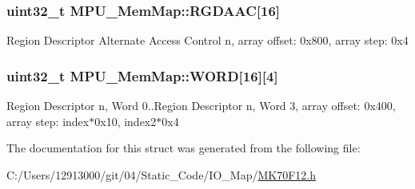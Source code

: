 \subsubsection[{R\+G\+D\+A\+A\+C}]{\setlength{\rightskip}{0pt plus 5cm}uint32\+\_\+t M\+P\+U\+\_\+\+Mem\+Map\+::\+R\+G\+D\+A\+A\+C\mbox{[}16\mbox{]}}\label{struct_m_p_u___mem_map_a7f9c813f610ff2ffa2027cec351b0b1f}
Region Descriptor Alternate Access Control n, array offset\+: 0x800, array step\+: 0x4 \hypertarget{struct_m_p_u___mem_map_ac0f1b1c2b2f2b70a90e02302add086f1}{}
\subsubsection[{W\+O\+R\+D}]{\setlength{\rightskip}{0pt plus 5cm}uint32\+\_\+t M\+P\+U\+\_\+\+Mem\+Map\+::\+W\+O\+R\+D\mbox{[}16\mbox{]}\mbox{[}4\mbox{]}}\label{struct_m_p_u___mem_map_ac0f1b1c2b2f2b70a90e02302add086f1}
Region Descriptor n, Word 0..Region Descriptor n, Word 3, array offset\+: 0x400, array step\+: index$\ast$0x10, index2$\ast$0x4 

The documentation for this struct was generated from the following file\+:\begin{DoxyCompactItemize}
\item 
C\+:/\+Users/12913000/git/04/\+Static\+\_\+\+Code/\+I\+O\+\_\+\+Map/\hyperlink{_m_k70_f12_8h}{M\+K70\+F12.\+h}\end{DoxyCompactItemize}
